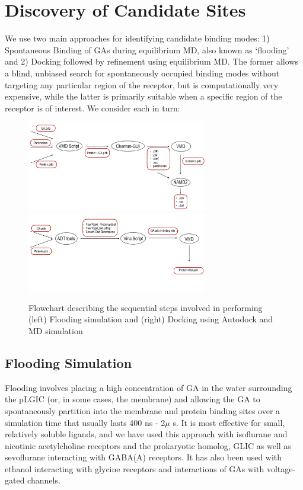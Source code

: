 \documentclass[12pt]{article}
\begin{document}
\section{Discovery of Candidate Sites}
We use two main approaches for identifying candidate binding modes: 1) Spontaneous Binding of GAs during equilibrium MD, also known as `flooding' and 2) Docking followed by refinement using equilibrium MD.  The former allows a blind, unbiased search for spontaneously occupied binding modes without targeting any particular region of the receptor, but is computationally very expensive, while the latter is primarily suitable when a specific region of the receptor is of interest.  We consider each in turn: 
\begin{figure}
\begin{center}
\centering
\includegraphics[width = 0.7\textwidth]{finlpics/flowchart_flooding}
\includegraphics[width =  0.7\textwidth]{finlpics/Flowchart_docking}
\caption{Flowchart describing  the sequential steps involved in performing (left) Flooding simulation and (right) Docking using Autodock and MD simulation}
\label{fig:flowchart_flood}
\end{center}
\end{figure}
\subsection{Flooding Simulation}
Flooding involves placing a high concentration of GA in the water surrounding the pLGIC (or, in some cases, the membrane) and allowing the GA to spontaneously partition into the membrane and protein binding sites over a simulation time that usually lasts 400 ns - 2$\mu$ s. It is most effective for small, relatively soluble ligands, and we have used this approach with isoflurane and nicotinic acetylcholine receptors and the prokaryotic homolog, GLIC\cite{Brannigan2010a} as well as sevoflurane interacting with GABA(A) receptors\cite{Murlidaran2017}.  It has also been used with ethanol interacting with glycine receptors\cite{Murail2011} and interactions of GAs with voltage-gated channels\cite{Raju2013}.
\end{document}
